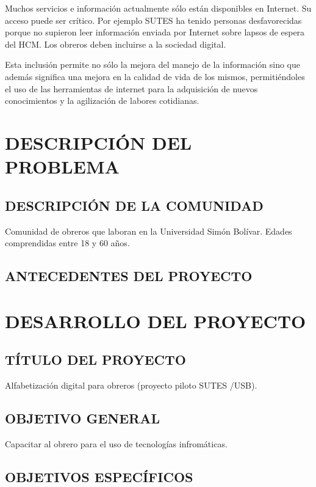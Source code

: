 \documentclass[letterpaper,12pt]{article}
\begin{document}
		Muchos servicios e información actualmente sólo están disponibles en Internet. Su acceso puede ser crítico. Por ejemplo SUTES ha tenido personas desfavorecidas porque no supieron leer información enviada por Internet sobre lapsos de espera del HCM. Los obreros deben incluirse a la sociedad digital.
        
        Esta inclusión permite no sólo la mejora del manejo de la información sino que además significa una mejora en la calidad de vida de los mismos, permitiéndoles el uso de las herramientas de internet para la adquisición de nuevos conocimientos y la agilización de labores cotidianas.
	\pagebreak
	
	\section{DESCRIPCIÓN DEL PROBLEMA}
		\subsection{DESCRIPCIÓN DE LA COMUNIDAD}
        
			Comunidad de obreros que laboran en la Universidad Simón Bolívar. Edades comprendidas entre 18 y 60 años.
		\subsection{ANTECEDENTES DEL PROYECTO}
	\pagebreak
	
	\section{DESARROLLO DEL PROYECTO}
        \subsection{TÍTULO DEL PROYECTO}
        
            Alfabetización digital para obreros (proyecto piloto SUTES /USB).
        \subsection{OBJETIVO GENERAL}
        
            Capacitar al obrero para el uso de tecnologías infromáticas.
            
        \subsection{OBJETIVOS ESPECÍFICOS}
        
\end{document}
